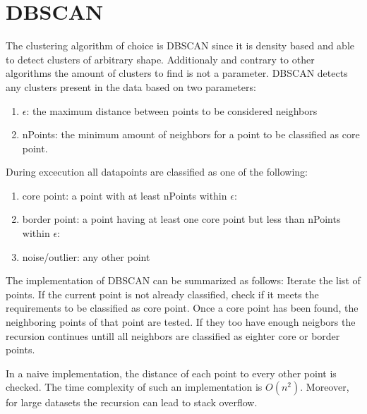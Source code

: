 \documentclass[letterpaper,10pt,english]{sphinxmanual}
\begin{document}
\section{DBSCAN}
\label{\detokenize{NBodySimulation/Clustering:dbscan}}
\sphinxAtStartPar
The clustering algorithm of choice is DBSCAN since it is density based and able to detect clusters of arbitrary shape.
Additionaly and contrary to other algorithms the amount of clusters to find is not a parameter. DBSCAN detects any clusters present in the data based on two parameters:
\begin{enumerate}
%
\item {} 
\sphinxAtStartPar
\(\epsilon\): the maximum distance between points to be considered neighbors

\item {} 
\sphinxAtStartPar
nPoints: the minimum amount of neighbors for a point to be classified as core point.

\end{enumerate}

\sphinxAtStartPar
During excecution all datapoints are classified as one of the following:
\begin{enumerate}
%
\item {} 
\sphinxAtStartPar
core point: a point with at least nPoints within \(\epsilon\):

\item {} 
\sphinxAtStartPar
border point: a point having at least one core point but less than nPoints within \(\epsilon\):

\item {} 
\sphinxAtStartPar
noise/outlier: any other point

\end{enumerate}

\sphinxAtStartPar
The implementation of DBSCAN can be summarized as follows: Iterate the list of points. If the current point is not already classified, check if it meets the requirements to be classified as core point.
Once a core point has been found, the neighboring points of that point are tested. If they too have enough neigbors the recursion continues untill all neighbors are classified as eighter core or border points.

\sphinxAtStartPar
In a naive implementation, the distance of each point to every other point is checked. The time complexity of such an implementation is \(O(n^2)\).
Moreover, for large datasets the recursion can lead to stack overflow.
\end{document}
